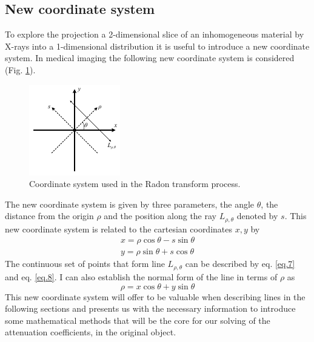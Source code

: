 \documentclass[12pt]{article}
\begin{document}
\subsection{New coordinate system}
To explore the projection a 2-dimensional slice of an inhomogeneous material by X-rays into a 1-dimensional distribution it is useful to introduce a new coordinate system. In medical imaging the following new coordinate system is considered (Fig. \ref{fig.1}).
\begin{figure}[hbt]
	\includegraphics[width=.4\textwidth]{theory/new_coordinate_system}
	\caption{Coordinate system used in the Radon transform process. }	\label{fig.1}
\end{figure}
The new coordinate system is given by three parameters, the angle $\theta$, the distance from the origin $\rho$ and the position along the ray $L_{\rho,\theta}$ denoted by $s$. This new coordinate system is related to the cartesian coordinates $x, y$ by 
\begin{align}
 	x=\rho\cos{\theta} - s\sin{\theta}\label{eq.7}\\
 	y= \rho\sin{\theta} + s\cos{\theta}\label{eq.8}
\end{align}
The continuous set of points that form line $L_{\rho,\theta}$ can be described by eq. \ref{eq.7} and eq. \ref{eq.8}. I can also establish the normal form of the line in terms of $\rho$ as
\begin{equation}\label{eq.9}
	\rho = x\cos{\theta} + y\sin{\theta}
\end{equation}
This new coordinate system will offer to be valuable when describing lines in the following sections and presents us with the necessary information to introduce some mathematical methods that will be the core for our solving of the attenuation coefficients, in the original object.
\end{document}
